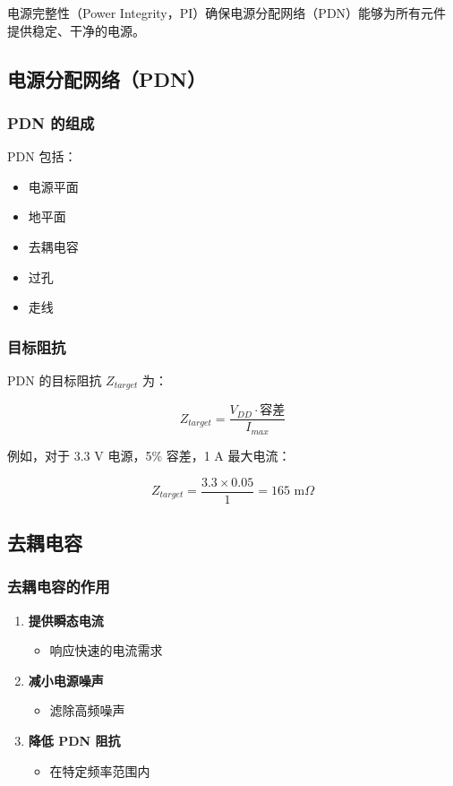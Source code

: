 电源完整性（Power Integrity，PI）确保电源分配网络（PDN）能够为所有元件提供稳定、干净的电源。

\subsection{电源分配网络（PDN）}

\subsubsection{PDN 的组成}

PDN 包括：
\begin{itemize}
  \item 电源平面
  \item 地平面
  \item 去耦电容
  \item 过孔
  \item 走线
\end{itemize}

\subsubsection{目标阻抗}

PDN 的目标阻抗 $Z_{target}$ 为：

\begin{equation}
Z_{target} = \frac{V_{DD} \cdot \text{容差}}{I_{max}} \label{eq:target-impedance}
\end{equation}

例如，对于 3.3 V 电源，5\% 容差，1 A 最大电流：

\begin{equation}
Z_{target} = \frac{3.3 \times 0.05}{1} = 165 \text{ m}\Omega
\end{equation}

\subsection{去耦电容}

\subsubsection{去耦电容的作用}

\begin{enumerate}
  \item \textbf{提供瞬态电流}
    \begin{itemize}
      \item 响应快速的电流需求
    \end{itemize}

  \item \textbf{减小电源噪声}
    \begin{itemize}
      \item 滤除高频噪声
    \end{itemize}

  \item \textbf{降低 PDN 阻抗}
    \begin{itemize}
      \item 在特定频率范围内
    \end{itemize}
\end{enumerate}


